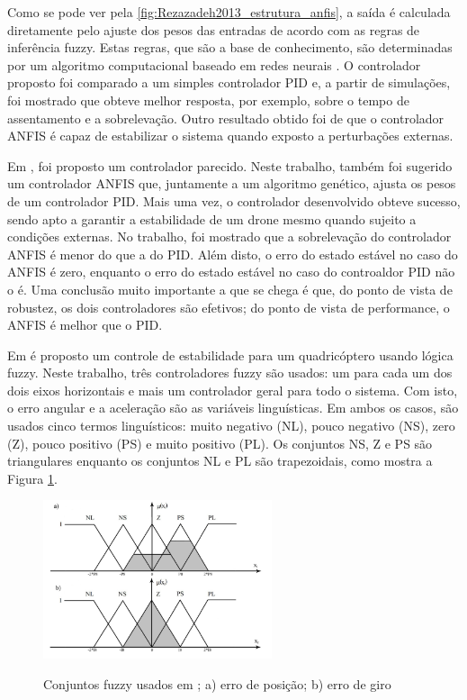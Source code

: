 Como se pode ver pela \autoref{fig:Rezazadeh2013_estrutura_anfis}, a saída é calculada diretamente pelo ajuste dos pesos das entradas de acordo com as regras de inferência fuzzy. Estas regras, que são a base de conhecimento, são determinadas por um algoritmo computacional baseado em redes neurais \cite{Rezazadeh2013}. O controlador proposto foi comparado a um simples controlador PID e, a partir de simulações, foi mostrado que obteve melhor resposta, por exemplo, sobre o tempo de assentamento e a sobrelevação. Outro resultado obtido foi de que o controlador ANFIS é capaz de estabilizar o sistema quando exposto a perturbações externas.

Em \cite{Mahfouz2013}, foi proposto um controlador parecido. Neste trabalho, também foi sugerido um controlador ANFIS que, juntamente a um algoritmo genético, ajusta os pesos de um controlador PID. Mais uma vez, o controlador desenvolvido obteve sucesso, sendo apto a garantir a estabilidade de um drone mesmo quando sujeito a condições externas. No trabalho, foi mostrado que a sobrelevação do controlador ANFIS é menor do que a do PID. Além disto, o erro do estado estável no caso do ANFIS é zero, enquanto o erro do estado estável no caso do controaldor PID não o é. Uma conclusão muito importante a que se chega é que, do ponto de vista de robustez, os dois controladores são efetivos; do ponto de vista de performance, o ANFIS é melhor que o PID.

Em \cite{Maj2013} é proposto um controle de estabilidade para um quadricóptero usando lógica fuzzy. Neste trabalho, três controladores fuzzy são usados: um para cada um dos dois eixos horizontais e mais um controlador geral para todo o sistema. Com isto, o erro angular e a aceleração são as variáveis linguísticas. Em ambos os casos, são usados cinco termos linguísticos: muito negativo (NL), pouco negativo (NS), zero (Z), pouco positivo (PS) e muito positivo (PL). Os conjuntos NS, Z e PS são triangulares enquanto os conjuntos NL e PL são trapezoidais, como mostra a Figura \ref{fig:Maj2013_fuzzy_sets}. 

\begin{figure}[!htb]
    \centering
    \caption{Conjuntos fuzzy usados em \cite{Maj2013}; a) erro de posição; b) erro de giro }
    \includegraphics[width=0.6\textwidth]{./04-figuras/Maj2013_fuzzy_sets}
    \label{fig:Maj2013_fuzzy_sets}
\end{figure}

